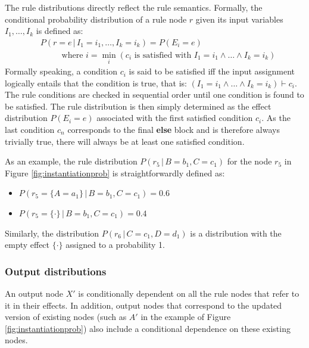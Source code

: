 The rule distributions directly reflect the rule semantics.  Formally, the conditional probability distribution of a rule node $r$ given its input variables $I_1, \dots, I_k$ is defined as: 
\begin{align}
& P(r\!=\!e \, | \, I_1\!=\!i_1, \dots, I_k\!=\!i_k) = P(E_i = e) \label{eq:ruledistrib}
 \\ 
& \; \; \; \; \; \; \; \; \text{ where } i = \min_i (c_i \text{ is satisfied with } I_1\!=\!i_1 \land \dots \land I_k\!=\!i_k) \nonumber 
\end{align}
Formally speaking, a condition $c_i$ is said to be satisfied iff the input assignment logically entails that the condition is true, that is: $(I_1\!=\!i_1 \land \dots \land I_k\!=\!i_k) \vdash c_i$. The rule conditions are checked in sequential order until one condition is found to be satisfied. The rule distribution is then simply determined as the effect distribution $P(E_i\!=\!e)$ associated with the first satisfied condition $c_i$.  As the last condition $c_n$ corresponds to the final \textbf{else} block and is therefore always trivially true, there will always be at least one satisfied condition. 

As an example, the rule distribution $P(r_5 \, | \, B\!=\!b_1, C\!=\!c_1)$ for the node $r_5$ in Figure \ref{fig:instantiationprob} is straightforwardly defined as:
\begin{itemize}
\item $P(r_5 = \{A\!=\!a_1\} \, | \, B\!=\!b_1, C\!=\!c_1) = 0.6$
\item  $P(r_5 = \{\cdot\} \, | \, B\!=\!b_1, C\!=\!c_1) = 0.4$
\end{itemize}

Similarly, the distribution $P(r_6 \, | \, C\!=\!c_1, D\!=\!d_1)$ is a distribution with the empty effect $\{\cdot\}$ assigned to a probability 1. 

\subsubsection*{Output distributions} 

An output node $X'$ is conditionally dependent on all the rule nodes that refer to it in their effects.  In addition, output nodes that correspond to the updated version of existing nodes (such as $A'$ in the example of Figure \ref{fig:instantiationprob}) also include a conditional dependence on these existing nodes.

